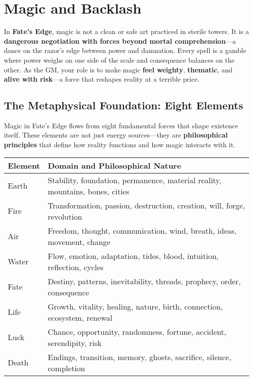 \chapter{Magic and Backlash}

In \textbf{Fate's Edge}, magic is not a clean or safe art practiced in sterile towers. It is a \textbf{dangerous negotiation with forces beyond mortal comprehension}—a dance on the razor's edge between power and damnation. Every spell is a gamble where power weighs on one side of the scale and consequence balances on the other. As the GM, your role is to make magic \textbf{feel weighty}, \textbf{thematic}, and \textbf{alive with risk}—a force that reshapes reality at a terrible price.

\section*{The Metaphysical Foundation: Eight Elements}

Magic in Fate's Edge flows from eight fundamental forces that shape existence itself. These elements are not just energy sources—they are \textbf{philosophical principles} that define how reality functions and how magic interacts with it.

\begin{fatebox}
\begin{tabularx}{\textwidth}{lX}
\toprule
\textbf{Element} & \textbf{Domain and Philosophical Nature} \\
\midrule
Earth & Stability, foundation, permanence, material reality, mountains, bones, cities \\
Fire & Transformation, passion, destruction, creation, will, forge, revolution \\
Air & Freedom, thought, communication, wind, breath, ideas, movement, change \\
Water & Flow, emotion, adaptation, tides, blood, intuition, reflection, cycles \\
Fate & Destiny, patterns, inevitability, threads, prophecy, order, consequence \\
Life & Growth, vitality, healing, nature, birth, connection, ecosystem, renewal \\
Luck & Chance, opportunity, randomness, fortune, accident, serendipity, risk \\
Death & Endings, transition, memory, ghosts, sacrifice, silence, completion \\
\bottomrule
\end{tabularx}
\end{fatebox}


